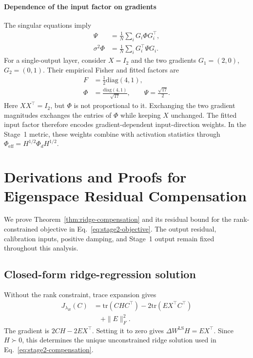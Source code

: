 \paragraph{Dependence of the input factor on gradients}
The singular equations imply
\begin{equation}
\begin{aligned}
\Psi&=\frac1N\sum_iG_i\Phi G_i^\top,\\
\sigma^2\Phi&=\frac1N\sum_iG_i^\top\Psi G_i.
\end{aligned}
\end{equation}
For a single-output layer, consider $X=I_2$ and the two gradients $G_1=(2,0)$, $G_2=(0,1)$. Their empirical Fisher and fitted factors are
\begin{equation}
\begin{aligned}
F&=\tfrac12\mathrm{diag}(4,1),\\
\Phi&=\frac{\mathrm{diag}(4,1)}{\sqrt{17}},\qquad
\Psi=\frac{\sqrt{17}}2.
\end{aligned}
\end{equation}
Here $XX^\top=I_2$, but $\Phi$ is not proportional to it. Exchanging the two gradient magnitudes exchanges the entries of $\Phi$ while keeping $X$ unchanged. The fitted input factor therefore encodes gradient-dependent input-direction weights. In the Stage~1 metric, these weights combine with activation statistics through $\Phi_{\mathrm{eff}}=H^{1/2}\Phi_dH^{1/2}$.

\section{Derivations and Proofs for Eigenspace Residual Compensation}\label{sup:lemma-corollary}

We prove Theorem~\ref{thm:ridge-compensation} and its residual bound for the rank-constrained objective in Eq.~\eqref{eq:stage2-objective}. The output residual, calibration inputs, positive damping, and Stage~1 output remain fixed throughout this analysis.

\subsection{Closed-form ridge-regression solution}\label{sup:ridge-derivation}

Without the rank constraint, trace expansion gives
\begin{equation}
\begin{aligned}
J_{\lambda_H}(C)
&=\mathrm{tr}(CHC^\top)-2\mathrm{tr}(EX^\top C^\top) \\
&\quad+\|E\|_F^2.
\end{aligned}
\end{equation}
The gradient is $2CH-2EX^\top$. Setting it to zero gives $\Delta W^{\mathrm{LS}}H=EX^\top$. Since $H\succ0$, this determines the unique unconstrained ridge solution used in Eq.~\eqref{eq:stage2-compensation}.

